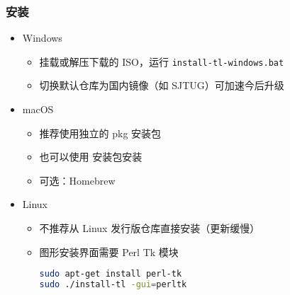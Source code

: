 \begin{frame}[fragile]
  \frametitle{安装}
  \begin{itemize}
    \item Windows
          \begin{itemize}
            \item 挂载或解压下载的 ISO，运行 \verb|install-tl-windows.bat|
            \item 切换默认仓库为国内镜像（如 SJTUG）可加速今后升级
          \end{itemize}
    \item macOS
          \begin{itemize}
            \item 推荐使用独立的 pkg 安装包
            \item 也可以使用 \TL 安装包安装
            \item 可选：Homebrew 
          \end{itemize}
    \item Linux
          \begin{itemize}
            \item 不推荐从 Linux 发行版仓库直接安装（更新缓慢）
            \item 图形安装界面需要 Perl Tk 模块
                  \begin{lstlisting}[language=bash]
sudo apt-get install perl-tk
sudo ./install-tl -gui=perltk
        \end{lstlisting}
          \end{itemize}
  \end{itemize}
\end{frame}

